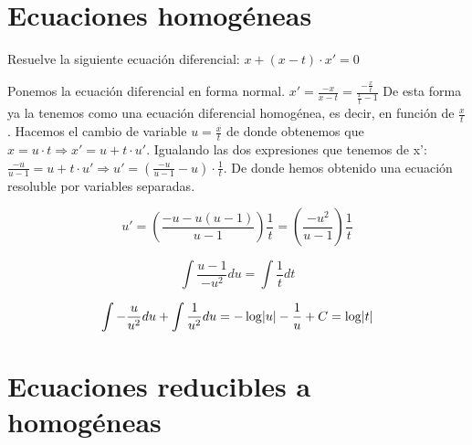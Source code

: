 
\section{Ecuaciones homogéneas}
\begin{ejer}
	Resuelve la siguiente ecuación diferencial: $x+(x-t)\cdot x' = 0$
\end{ejer}
\begin{sol}
	Ponemos la ecuación diferencial en forma normal.  
	$x' = \frac{-x}{x-t} = \frac{-\frac{x}{t}}{\frac{x}{t}-1}$  
	De esta forma ya la tenemos como una ecuación diferencial homogénea, es decir, en función de $\frac{x}{t}$.  
	Hacemos el cambio de variable $u = \frac{x}{t}$ de donde obtenemos que $x = u\cdot t \Rightarrow x' = u + t\cdot u'$.  
	Igualando las dos expresiones que tenemos de x':  
	$\frac{-u}{u-1} = u + t\cdot u' \Rightarrow u' = (\frac{-u}{u-1}-u)\cdot \frac{1}{t}$.  
	De donde hemos obtenido una ecuación resoluble por variables separadas.
        
	\[u' = \left(\frac{-u-u(u-1)}{u-1}\right)\frac{1}{t} = \left(\frac{-u^2}{u-1}\right)\frac{1}{t}\]
        
	\[\int \frac{u-1}{-u^2}du = \int \frac{1}{t}dt\]

        \[ \int -\frac{u}{u^2}du + \int \frac{1}{u^2}du = -\log \lvert u\rvert - \frac{1}{u} + C = \log \lvert t\rvert \]
\end{sol}


\section{Ecuaciones reducibles a homogéneas}


